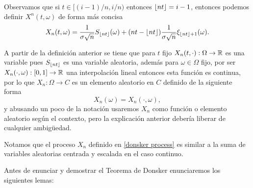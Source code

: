 \documentclass[12pt,oneside]{book}
\newcounter{lema}[chapter]
\numberwithin{equation}{chapter}
\begin{document}
Observamos que si $t\in [(i-1)/n,i/n)$ entonces $\lfloor nt\rfloor=i-1$, entonces podemos definir $X^n(t,\omega)$ de forma más concisa
\begin{equation}
    \label{donsker process}
    X_n(t,\omega)=\frac{1}{\sigma\sqrt{n}}S_{\lfloor nt\rfloor}(\omega)+(nt-\lfloor nt\rfloor)\frac{1}{\sigma\sqrt{n}}\xi_{\lfloor nt\rfloor+1}(\omega).
\end{equation}

A partir de la definición anterior se tiene que para $t$ fijo $X_n(t,\cdot):\Omega\to\R$ es una variable pues $S_{\lfloor nt\rfloor}$ es una variable aleatoria, además para $\omega \in\Omega$ fijo, por ser $X_n(\cdot,\omega):[0,1]\to\R$ una interpolación lineal entonces esta función es continua, por lo que $X_n:\Omega\to C$ es un elemento aleatorio en $C$ definido de la siguiente forma 
\[
    X_n(\omega)=X_n(\cdot,\omega),
\] 
y abusando un poco de la notación usaremos $X_n$ como función o elemento aleatorio según el contexto, pero la explicación anterior debería liberar de cualquier ambigüedad.

Notamos que el proceso $X_n$ definido en \eqref{donsker process} es similar a la suma de variables aleatorias centrada y escalada en el caso continuo. 

Antes de enunciar y demostrar el Teorema de Donsker enunciaremos los siguientes lemas:
\end{document}
